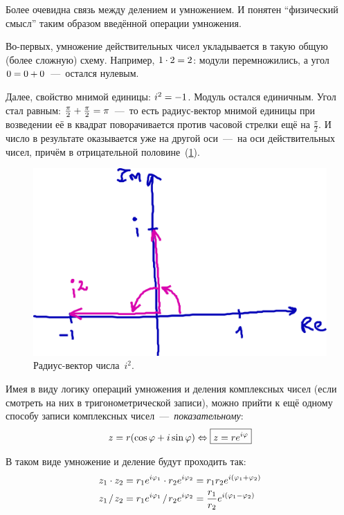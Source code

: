 \documentclass[a4paper,12pt]{article}
\newcommand*{\slashdiv}{\makebox[\widthof{${}\cdot{}$}]{{}/{}}}
\begin{document}
  Более очевидна связь между делением и умножением.
  И понятен ``физический смысл'' таким образом введённой операции умножения.

  \begin{example}
    Во-первых, умножение действительных чисел укладывается в такую общую (более сложную) схему.
    Например, $1 \cdot 2 \hm= 2$: модули перемножились, а угол $0 \hm= 0 \hm+ 0$~---~остался нулевым.

    Далее, свойство мнимой единицы: $i^2 \hm= -1$.
    Модуль остался единичным.
    Угол стал равным: $\frac{\pi}{2} \hm+ \frac{\pi}{2} \hm= \pi$~---~то есть радиус-вектор мнимой единицы при возведении её в квадрат поворачивается против часовой стрелки ещё на $\frac{\pi}{2}$.
    И число в результате оказывается уже на другой оси~---~на оси действительных чисел, причём в отрицательной половине~(\ref{fig:i-i}).

    \begin{figure}[ht]
      \centering
      \includegraphics[width=0.6\linewidth]{images/i-i}
    
      \caption{
        Радиус-вектор числа~$i^2$.
      }
      \label{fig:i-i}
    \end{figure}
  \end{example}

  Имея в виду логику операций умножения и деления комплексных чисел (если смотреть на них в тригонометрической записи), можно прийти к ещё одному способу записи комплексных чисел~---~\emph{показательному}:
  \begin{equation}
      z \hm= r(\cos \phi + i \sin \phi) \Leftrightarrow \boxed{
          z = re^{i\phi}
      }
  \end{equation}

  В таком виде умножение и деление будут проходить так:
  \[
    \begin{aligned}
      &z_1 \cdot z_2 = r_1e^{i\phi_1} \cdot r_2e^{i\phi_2} = r_1 r_2 e^{i(\phi_1 + \phi_2)}\\
      &z_1 \slashdiv z_2 = r_1e^{i\phi_1} \slashdiv r_2e^{i\phi_2} = \frac{r_1}{r_2} e^{i(\phi_1 - \phi_2)}
    \end{aligned}
  \]
\end{document}
